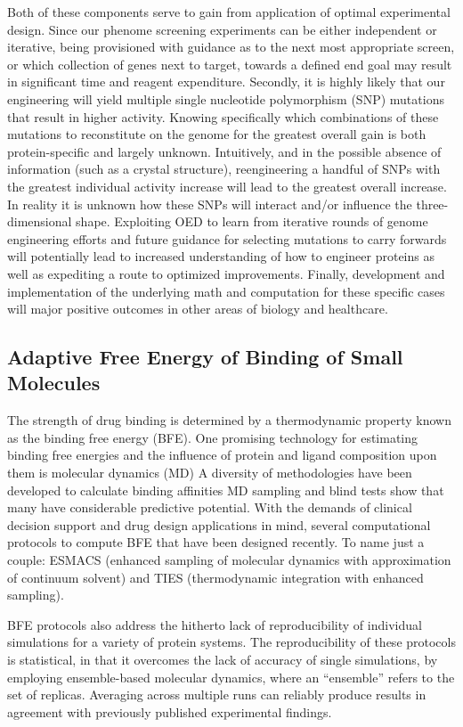 \documentclass[11pt]{article}
\begin{document}
Both of these components serve to gain from application of optimal experimental design. Since our phenome screening experiments can be either independent or iterative, being provisioned with guidance as to the next most appropriate screen, or which collection of genes next to target, towards a defined end goal may result in significant time and reagent expenditure. Secondly, it is highly likely that our engineering will yield multiple single nucleotide polymorphism (SNP) mutations that result in higher activity. Knowing specifically which combinations of these mutations to reconstitute on the genome for the greatest overall gain is both protein-specific and largely unknown. Intuitively, and in the possible absence of information (such as a crystal structure), reengineering a handful of SNPs with the greatest individual activity increase will lead to the greatest overall increase. In reality it is unknown how these SNPs will interact and/or influence the three-dimensional shape. Exploiting OED to learn from iterative rounds of genome engineering efforts and future guidance for selecting mutations to carry forwards will potentially lead to increased understanding of how to engineer proteins as well as expediting a route to optimized improvements. Finally, development and implementation of the underlying math and computation for these specific cases will major positive outcomes in other areas of biology and healthcare.  

\subsection{Adaptive Free Energy of Binding of Small Molecules}

The strength of drug binding is determined by a thermodynamic property known
as the binding free energy (BFE). One promising technology for estimating
binding free energies and the influence of protein and ligand composition upon
them is molecular dynamics (MD) A diversity of methodologies have been
developed to calculate binding affinities MD sampling and blind tests show
that many have considerable predictive potential. With the demands of clinical
decision support and drug design applications in mind, several computational
protocols to compute BFE that have been designed recently. To name just a
couple: ESMACS (enhanced sampling of molecular dynamics with approximation of
continuum solvent) and TIES (thermodynamic integration with enhanced
sampling).

BFE protocols also address the hitherto lack of reproducibility of individual
simulations for a variety of protein systems. The reproducibility of these
protocols is statistical, in that it overcomes the lack of accuracy of single
simulations, by employing ensemble-based molecular dynamics, where an
``ensemble'' refers to the set of replicas. Averaging across multiple runs can
reliably produce results in agreement with previously published experimental
findings.
\end{document}
